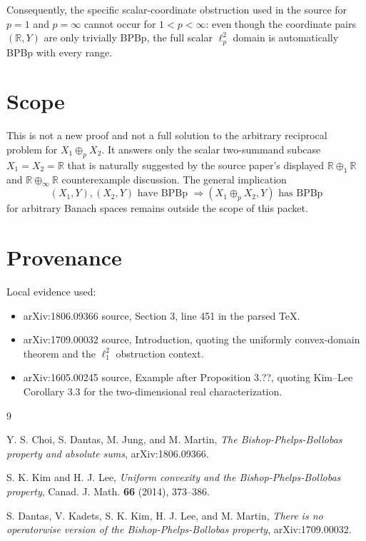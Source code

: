 \documentclass[11pt]{article}
\newcommand{\R}{\mathbb{R}}
\begin{document}
Consequently, the specific scalar-coordinate obstruction used in the source
for $p=1$ and $p=\infty$ cannot occur for $1<p<\infty$: even though the
coordinate pairs $(\R,Y)$ are only trivially BPBp, the full scalar
$\ell_p^2$ domain is automatically BPBp with every range.

\section*{Scope}

This is not a new proof and not a full solution to the arbitrary reciprocal
problem for $X_1\oplus_p X_2$.  It answers only the scalar two-summand subcase
$X_1=X_2=\R$ that is naturally suggested by the source paper's displayed
$\R\oplus_1\R$ and $\R\oplus_\infty\R$ counterexample discussion.  The
general implication
\[
  (X_1,Y), (X_2,Y) \text{ have BPBp } \Longrightarrow
  (X_1\oplus_p X_2,Y) \text{ has BPBp}
\]
for arbitrary Banach spaces remains outside the scope of this packet.

\section*{Provenance}

Local evidence used:
\begin{itemize}
  \item arXiv:1806.09366 source, Section 3, line 451 in the parsed TeX.
  \item arXiv:1709.00032 source, Introduction, quoting the uniformly
  convex-domain theorem and the $\ell_1^2$ obstruction context.
  \item arXiv:1605.00245 source, Example after Proposition 3.??, quoting
  Kim--Lee Corollary 3.3 for the two-dimensional real characterization.
\end{itemize}

\begin{thebibliography}{9}

Y. S. Choi, S. Dantas, M. Jung, and M. Martin,
\emph{The Bishop-Phelps-Bollobas property and absolute sums},
arXiv:1806.09366.

S. K. Kim and H. J. Lee,
\emph{Uniform convexity and the Bishop-Phelps-Bollobas property},
Canad. J. Math. \textbf{66} (2014), 373--386.

S. Dantas, V. Kadets, S. K. Kim, H. J. Lee, and M. Martin,
\emph{There is no operatorwise version of the Bishop-Phelps-Bollobas property},
arXiv:1709.00032.

\end{thebibliography}
\end{document}
